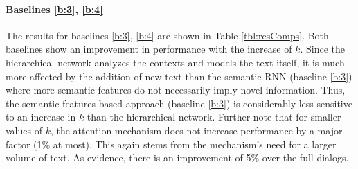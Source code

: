 \paragraph*{Baselines \ref{b:3}, \ref{b:4}}
The results for baselines \ref{b:3}, \ref{b:4} are shown in Table \ref{tbl:resComps}. 
Both baselines show an improvement in performance with the increase of $k$. 
Since the hierarchical network analyzes the contexts and models the text itself, 
it is much more affected by the addition of new text than the semantic RNN (baseline \ref{b:3}) where more semantic features 
do not necessarily imply novel information. 
Thus, the semantic features based approach (baseline \ref{b:3}) is considerably 
less sensitive to an increase in $k$ than the hierarchical network. 
Further note that for smaller values of $k$, the attention mechanism 
does not increase performance by a major factor (1\% at most). This again stems from 
the mechanism's need for a larger volume of text. As evidence, there is 
an improvement of 5\% over the full dialogs. 
